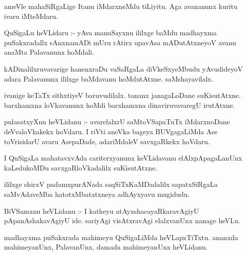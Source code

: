 \documentclass{article}
\begin{document}
\begin{mn}
ameVle  mahaSiRgaLige  Itanu  iMdarxneMdu  tiLiyitu.  Aga  avananunx  kuritu  ivaru  iMteMdaru.
\end{mn}

\begin{mn}
QuSigaLu  heVLidaru :- yAva manuSayxnu  ililxge  baMdu  madhayxma puSakxradallx  sAnxnamADi  
mUru rAtirx  upavAsa mADutAtxneyoV  avanu  anaMta  Palavanunx  hoMdali.
\end{mn}

\begin{mn}
kADinalilxruvavarige  hanenxraDu  vaSaRgaLa  diVkeSxyeMbudu  yAvudideyoV  adara  Palavanunx  
ililxge  baMdavanu  hoMdutAtxne.  saMshayavilalx.
\end{mn}

\begin{mn}
ivanige  keTaTx  sithxtiyeV  baruvudilalx.  tananx  janagaLoDane  suKisutAtxne.  barxhamxna  
loVkavanunx  hoMdi  barxhamxna  dinaviruvavaregU  irutAtxne.
\end{mn}

\begin{mn}
pulasatxyXnu  heVLidanu :- avarelalxrU  saMtoVSapaTuTx  iMdarxnoDane  deVvaloVkakekx  hoVdaru.  I riVti  
aneVka bageya  BUVgagaLiMda  Ase  toVrisidarU  avaru  AsepaDade,  adariMdaleV  savxgaRkekx  hoVdaru.
\end{mn}

\begin{mn}
I  QuSigaLa  mahatavxvAda  cariterxyanunx  keVLidavanu  elAlxpApagaLanUnx  
kaLedukoMDu  savxgaRloVkadalilx  suKisutAtxne.
\end{mn}

\begin{mn}
ililxge  shirxV  padamxpurANada  saqSiTxKaMDadalilx  sapatxSiRgaLa  saMvAdaveMba  hatotxMbatatxneya  adhAyxyavu  mugidudu.
\end{mn}




\begin{mn}
BiVSamxnu  heVLidanu :- I katheyu  atAyxshacayaRkaravAgiyU  pApanAshakavAgiyU  
ide.  sariyAgi  visAtxravAgi  elalxvanUnx nanage  heVLu.
\end{mn}

\begin{mn}
madhayxma  puSakxrada  mahimeyu  QuSigaLiMda  heVLapxTiTxtu.  ananxda  mahimeyanUnx,  
PalavanUnx,  damada  mahimeyanUnx  heVLidanu.  
\end{mn}
\end{document}
